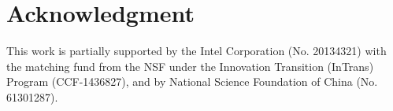 \documentclass[10pt, conference, compsocconf]{IEEEtran}
\begin{document}
\section*{Acknowledgment}
This work is partially supported by the Intel Corporation (No. 20134321) with the matching fund from the NSF under the Innovation Transition (InTrans) Program (CCF-1436827), 
and by National Science Foundation of China (No. 61301287).
%
%
%
\newcommand{\BIBdecl}{\setlength{\itemsep}{0.0 em}}

\scriptsize{ 

}
\end{document}
